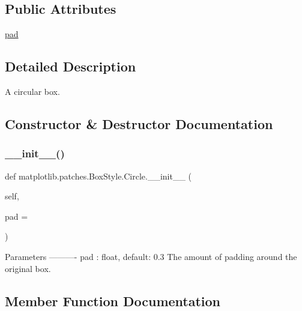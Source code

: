 \subsection*{Public Attributes}
\begin{DoxyCompactItemize}
\item 
\hyperlink{classmatplotlib_1_1patches_1_1BoxStyle_1_1Circle_ac264f4bb6e9af501cd9b9095f985b546}{pad}
\end{DoxyCompactItemize}


\subsection{Detailed Description}
\begin{DoxyVerb}A circular box.\end{DoxyVerb}
 

\subsection{Constructor \& Destructor Documentation}
\mbox{\label{classmatplotlib_1_1patches_1_1BoxStyle_1_1Circle_a12275b37eb3f400c83ba494550ac4a49}} 
\subsubsection{\texorpdfstring{\+\_\+\+\_\+init\+\_\+\+\_\+()}{\_\_init\_\_()}}
{\footnotesize\ttfamily def matplotlib.\+patches.\+Box\+Style.\+Circle.\+\_\+\+\_\+init\+\_\+\+\_\+ (\begin{DoxyParamCaption}\item[{}]{self,  }\item[{}]{pad = {} }\end{DoxyParamCaption})}

\begin{DoxyVerb}Parameters
----------
pad : float, default: 0.3
    The amount of padding around the original box.
\end{DoxyVerb}
 

\subsection{Member Function Documentation}
\mbox{\label{classmatplotlib_1_1patches_1_1BoxStyle_1_1Circle_a39e1b1fd380c5218000926bff885eea6}} 
